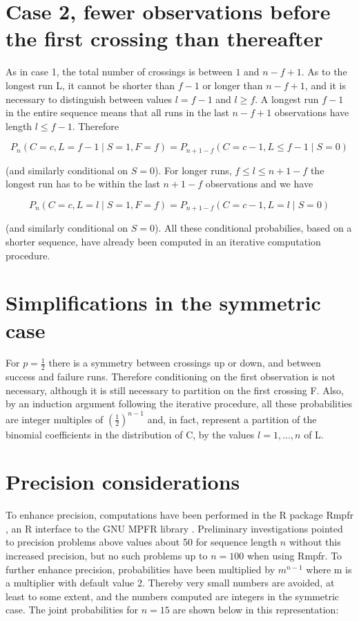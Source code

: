 \section{Case 2, fewer observations before the first crossing than thereafter}

As in case 1, the total number of crossings is between $1$ and $n-f+1$. As to the longest run L, it cannot be shorter than $f-1$ or longer than $n-f+1$, and it is necessary to distinguish between values $l=f-1$ and $l \geq f$. A longest run $f-1$ in the entire sequence means that all runs in the last $n-f+1$ observations have length $l \leq f-1$. Therefore 

$$P_n (C=c,L=f-1 \mid S=1,F=f) = P_{n+1-f} (C=c-1,L \leq f-1 \mid S=0)$$ 

(and similarly conditional on $S=0$). For longer runs, $f \leq l \leq n+1-f$ the longest run has to be within the last $n+1-f$ observations and we have 

$$P_n (C=c,L=l \mid S=1,F=f) = P_{n+1-f} (C=c-1,L=l \mid S=0)$$ 

(and similarly conditional on $S = 0$). All these conditional probabilies, based on a shorter sequence, have already been computed in an iterative computation procedure.
\section{Simplifications in the symmetric case}

For $p=\frac{1}{2}$ there is a symmetry between crossings up or down, and between success and failure runs. Therefore conditioning on the first observation is not necessary, although it is still necessary to partition on the first crossing F. Also, by an induction argument following the iterative procedure, all these probabilities are integer multiples of ${\left( \frac{1}{2} \right)}^{n-1}$ and, in fact, represent a partition of the binomial coefficients in the distribution of C, by the values $l=1, \ldots ,n$ of L.  

\section{Precision considerations}

To enhance precision, computations have been performed in the R package Rmpfr \citep{Rmpfr}, an R interface to the GNU MPFR library \citep{FouLHLPZ-2007}. Preliminary investigations pointed to precision problems above values about 50 for sequence length $n$ without this increased precision, but no such problems up to $n=100$ when using Rmpfr. To further enhance precision, probabilities have been multiplied by $m^{n-1}$ where m is a multiplier with default value 2. Thereby very small numbers are avoided, at least to some extent, and the numbers computed are integers in the symmetric case. The joint probabilities for $n=15$ are shown below in this representation:

